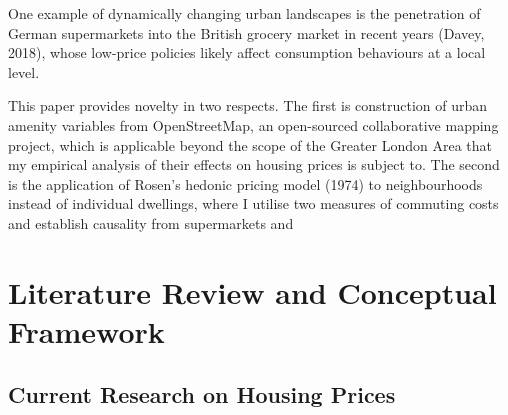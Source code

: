 \documentclass{article}
\begin{document}
 
  One example of dynamically changing urban landscapes is the penetration of German supermarkets into the British grocery market in recent years (Davey, 2018), whose low-price policies likely affect consumption behaviours at a local level. 


This paper provides novelty in two respects. The first is construction of urban amenity variables from OpenStreetMap, an open-sourced collaborative mapping project, which is applicable beyond the scope of the Greater London Area that my empirical analysis of their effects on housing prices is subject to. The second is the application of Rosen's hedonic pricing model (1974) to neighbourhoods instead of individual dwellings, where I utilise two measures of commuting costs and 
establish causality from supermarkets and 



\section{Literature Review and Conceptual Framework}
\subsection{Current Research on Housing Prices}
\end{document}
